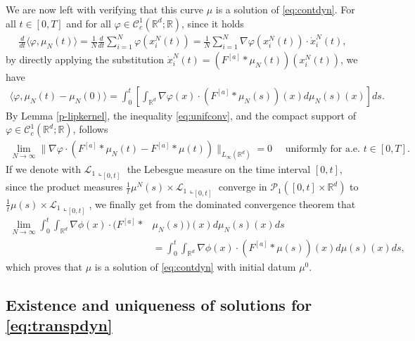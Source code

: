 \documentclass[A4paper,11pt]{article}
\theoremstyle{definition}
\newcommand{\R}{\mathbb{R}}
\newcommand{\Fun}[1]{F^{[#1]}}
\begin{document}
We are now left with verifying that this curve $\mu$ is a solution of \eqref{eq:contdyn}. For all $t \in [0,T]$ and for all $\varphi \in \mathcal{C}^1_c(\R^d;\R)$, since it holds
\begin{align*}
\frac{d}{dt}\langle \varphi, \mu_N(t) \rangle = \frac{1}{N}\frac{d}{dt} \sum^N_{i = 1} \varphi(x^N_i(t)) = \frac{1}{N} \sum^N_{i = 1} \nabla\varphi(x^N_i(t)) \cdot \dot{x}_i^N(t),
\end{align*}
by directly applying the substitution $\dot{x}_i^N(t) = (\Fun{a}*\mu_N(t))(x^N_i(t))$, we have
\begin{align*}
\langle \varphi, \mu_N(t) - \mu_N(0) \rangle = \int^t_0 \left[ \int_{\R^d}\nabla \varphi(x) \cdot (\Fun{a}*\mu_N(s))(x) d\mu_N(s)(x) \right] ds.
\end{align*}
By Lemma \ref{p-lipkernel}, the inequality \eqref{eq:unifconv}, and the compact support of $\varphi \in \mathcal{C}^1_c(\R^d;\R)$, follows
\begin{align*}
\lim_{N \rightarrow \infty} \|\nabla\varphi \cdot (\Fun{a}*\mu_N(t) - \Fun{a}*\mu(t))\|_{L_{\infty}(\R^d)} = 0 \quad \text{ uniformly for a.e. } t \in [0,T].
\end{align*}
If we denote with $\mathcal L_1\llcorner_{[0,t]}$ the Lebesgue measure on the time interval $[0,t]$, since the product measures $\frac{1}{t} \mu^{N}(s) \times \mathcal L_1\llcorner_{[0,t]}$ converge in $\mathcal P_1([0,t] \times \mathbb R^{d})$ to $\frac{1}{t} \mu(s) \times \mathcal L_1\llcorner_{[0,t]}$, we finally get from the dominated convergence theorem that
\begin{align*}
\lim_{N \to \infty} \int_0^{t} \int_{\mathbb R^{d}} \nabla \phi(x) \cdot (\Fun{a}*&\mu_N(s))(x) d\mu_N(s)(x) ds \\
&=  \int_0^{t} \int_{\mathbb R^{d}} \nabla \phi(x) \cdot (\Fun{a}*\mu(s))(x) d \mu(s)(x) ds,
\end{align*}
which proves that $\mu$ is a solution of \eqref{eq:contdyn} with initial datum $\mu^0$.


\subsection{Existence and uniqueness of solutions for  \eqref{eq:transpdyn}}\label{ap3}
\end{document}
